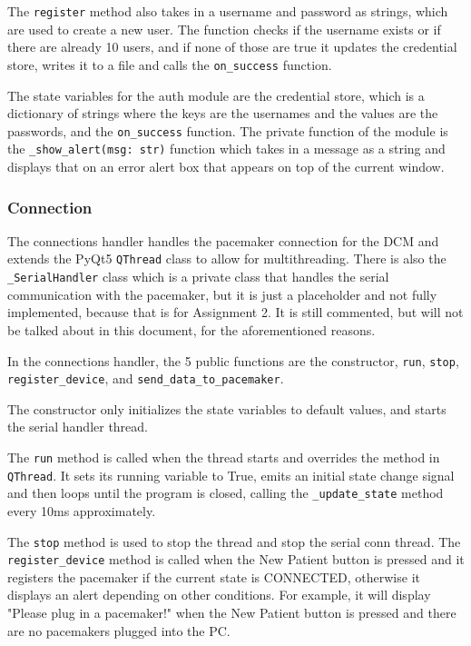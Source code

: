\documentclass[12pt]{article}
\begin{document}
The \verb|register| method also takes in a username and password as strings, which are used to create a new user. The function checks if the username exists or if there are already 10 users, and if none of those are true it updates the credential store, writes it to a file and calls the \verb|on_success| function.

The state variables for the auth module are the credential store, which is a dictionary of strings where the keys are the usernames and the values are the passwords, and the \verb|on_success| function. The private function of the module is the \verb|_show_alert(msg: str)| function which takes in a message as a string and displays that on an error alert box that appears on top of the current window.

\subsubsection{Connection}
The connections handler handles the pacemaker connection for the DCM and extends the PyQt5 \verb|QThread| class to allow for multithreading.
There is also the \verb|_SerialHandler| class which is a private class that handles the serial communication with the pacemaker, but it is just a placeholder and not fully implemented, because that is for Assignment 2.
It is still commented, but will not be talked about in this document, for the aforementioned reasons.

In the connections handler, the 5 public functions are the constructor, \verb|run|, \verb|stop|, \\ \verb|register_device|, and \verb|send_data_to_pacemaker|. 

The constructor only initializes the state variables to default values, and starts the serial handler thread.

The \verb|run| method is called when the thread starts and overrides the method in \verb|QThread|. It sets its running variable to True, emits an initial state change signal and then loops until the program is closed, calling the \verb|_update_state| method every 10ms approximately.

The \verb|stop| method is used to stop the thread and stop the serial conn thread.
The \\ \verb|register_device| method is called when the New Patient button is pressed and it registers the pacemaker if the current state is CONNECTED, otherwise it displays an alert depending on other conditions.
For example, it will display "Please plug in a pacemaker!" when the New Patient button is pressed and there are no pacemakers plugged into the PC.
\end{document}
